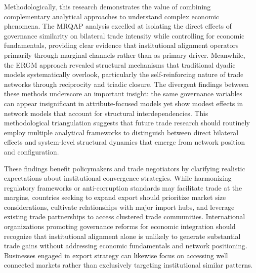 \documentclass[
]{article}
\begin{document}
Methodologically, this research demonstrates the value of combining
complementary analytical approaches to understand complex economic
phenomena. The MRQAP analysis excelled at isolating the direct effects
of governance similarity on bilateral trade intensity while controlling
for economic fundamentals, providing clear evidence that institutional
alignment operators primarily through marginal channels rather than as
primary driver. Meanwhile, the ERGM approach revealed structural
mechanisms that traditional dyadic models systematically overlook,
particularly the self-reinforcing nature of trade networks through
reciprocity and triadic closure. The divergent findings between these
methods underscore an important insight: the same governance variables
can appear insignificant in attribute-focused models yet show modest
effects in network models that account for structural interdependencies.
This methodological triangulation suggests that future trade research
should routinely employ multiple analytical frameworks to distinguish
between direct bilateral effects and system-level structural dynamics
that emerge from network position and configuration.

These findings benefit policymakers and trade negotiators by clarifying
realistic expectations about institutional convergence strategies. While
harmonizing regulatory frameworks or anti-corruption standards may
facilitate trade at the margins, countries seeking to expand export
should prioritize market size considerations, cultivate relationships
with major import hubs, and leverage existing trade partnerships to
access clustered trade communities. International organizations
promoting governance reforms for economic integration should recognize
that institutional alignment alone is unlikely to generate substantial
trade gains without addressing economic fundamentals and network
positioning. Businesses engaged in export strategy can likewise focus on
accessing well connected markets rather than exclusively targeting
institutional similar patterns.
\end{document}
